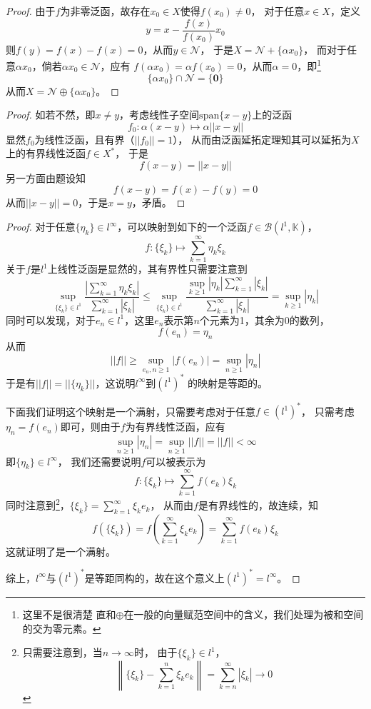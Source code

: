 \documentclass[cn]{homework}
\begin{document}
    \problem
    \begin{proof}
        由于$f$为非零泛函，故存在$x_0\in X$使得$f(x_0)\neq 0$，
        对于任意$x\in X$，定义
        \[y=x-\frac{f(x)}{f(x_0)}x_0\]
        则$f(y)=f(x)-f(x)=0$，从而$y\in\mathscr N$，
        于是$X=\mathscr N+\{\alpha x_0\}$，
        而对于任意$\alpha x_0$，倘若$\alpha x_0\in\mathscr N$，应有
        $f(\alpha x_0)=\alpha f(x_0)=0$，从而$\alpha=0$，即\footnote{这里不是很清楚
        直和$\oplus$在一般的向量赋范空间中的含义，我们处理为被和空间的交为零元素。}
        \[\{\alpha x_0\}\cap\mathscr N=\{\boldsymbol 0\}\]
        从而$X=\mathscr N\oplus\{\alpha x_0\}$。
    \end{proof}

    \problem
    \begin{proof}
        如若不然，即$x\neq y$，考虑线性子空间$\mathrm{span}\{x-y\}$上的泛函
        \[f_0:\alpha(x-y)\mapsto\alpha||x-y||\]
        显然$f_0$为线性泛函，且有界（$||f_0||=1$），
        从而由泛函延拓定理知其可以延拓为$X$上的有界线性泛函$f\in X^*$，
        于是
        \[f(x-y)=||x-y||\]
        另一方面由题设知
        \[f(x-y)=f(x)-f(y)=0\]
        从而$||x-y||=0$，于是$x=y$，矛盾。
    \end{proof}

    \problem
    \begin{proof}
        对于任意$\{\eta_k\}\in l^\infty$，可以映射到如下的一个泛函$f\in\mathscr B(l^1,\mathbb K)$，
        \[f:\{\xi_k\}\mapsto\sum_{k=1}^\infty\eta_k\xi_k\]
        关于$f$是$l^1$上线性泛函是显然的，其有界性只需要注意到
        \[\sup_{\{\xi_k\}\in l^1}
        \frac{\left|\sum_{k=1}^\infty\eta_k\xi_k\right|}
        {\sum_{k=1}^\infty|\xi_k|}
        \leq\sup_{\{\xi_k\}\in l^1}
        \frac{\sup_{k\geq 1}|\eta_k|\sum_{k=1}^\infty|\xi_k|}{\sum_{k=1}^\infty|\xi_k|}
        =\sup_{k\geq 1}|\eta_k|\]
        同时可以发现，对于$e_n\in l^1$，这里$e_n$表示第$n$个元素为1，其余为0的数列，
        \[f(e_n)=\eta_n\]
        从而
        \[||f||\geq\sup_{e_n,n\geq 1}|f(e_n)|=\sup_{n\geq 1}|\eta_n|\]
        于是有$||f||=||\{\eta_k\}||$，这说明$l^\infty$到$(l^1)^*$
        的映射是等距的。

        下面我们证明这个映射是一个满射，只需要考虑对于任意$f\in(l^1)^*$，
        只需考虑$\eta_n=f(e_n)$即可，则由于$f$为有界线性泛函，应有
        \[\sup_{n\geq 1}|\eta_n|=\sup_{n\geq 1}||f||=||f||<\infty\]
        即$\{\eta_k\}\in l^\infty$，
        我们还需要说明$f$可以被表示为
        \[f:\{\xi_k\}\mapsto\sum_{k=1}^\infty f(e_k)\xi_k\]
        同时注意到\footnote{只需要注意到，当$n\to\infty$时，
        由于$\{\xi_k\}\in l^1$，
            \[\left\|\{\xi_k\}-\sum_{k=1}^n\xi_ke_k\right\|
            =\sum_{k=n}^\infty|\xi_k|\to 0\]
        }，$\{\xi_k\}=\sum_{k=1}^\infty \xi_ke_k$，
        从而由$f$是有界线性的，故连续，知
        \[f(\{\xi_k\})=f(\sum_{k=1}^\infty\xi_ke_k)=\sum_{k=1}^\infty f(e_k)\xi_k\]
        这就证明了是一个满射。

        综上，$l^\infty$与$(l^1)^*$是等距同构的，故在这个意义上$(l^1)^*=l^\infty$。
    \end{proof}
\end{document}
